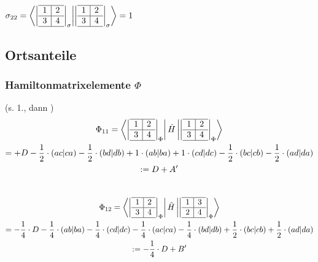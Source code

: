 \documentclass[12pt,a4paper]{article}
\begin{document}
$\sigma_{22} = \bra{\left|
  \begin{array}{c|c}
  \hline 
    1 & 2 \\ \hline 
    3 & 4 \\
    \hline 
  \end{array}
\right|_\sigma }  \ket{\left|
  \begin{array}{c|c}
  \hline 
    1 & 2 \\ \hline 
    3 & 4 \\
    \hline 
  \end{array}
 \right|_\sigma} = 1$ \\

\subsection{Ortsanteile}
\subsubsection{Hamiltonmatrixelemente $\Phi$}
(s. 1., dann )
\begin{gather}
\Phi_{11} = \bra{
\left|
  \begin{array}{c|c}
  \hline 
    1 & 2 \\ \hline 
    3 & 4 \\
    \hline 
  \end{array}
\right| _{\Phi}
} \hat{H} \ket{
\left|
  \begin{array}{c|c}
  \hline 
    1 & 2 \\ \hline 
    3 & 4 \\
    \hline 
  \end{array}
\right| _{\Phi}
} \\
 = + D - \frac{1}{2} \cdot (ac|ca) - \frac{1}{2} \cdot (bd|db) + 1 \cdot (ab|ba) + 1 \cdot (cd|dc) - \frac{1}{2} \cdot (bc|cb) - \frac{1}{2} \cdot (ad|da) \\ 
 := D + A' \label{eq:def_A_Strich}
 \end{gather} \\


\begin{gather}
\Phi_{12} = \bra{
\left|
  \begin{array}{c|c}
  \hline 
    1 & 2 \\ \hline 
    3 & 4 \\
    \hline 
  \end{array}
\right| _{\Phi}
} \hat{H} \ket{
\left|
  \begin{array}{c|c}
  \hline 
    1 & 3 \\ \hline 
    2 & 4 \\
    \hline 
  \end{array}
\right| _{\Phi}
} \\
 = - \frac{1}{4} \cdot D - \frac{1}{4} \cdot (ab|ba) - \frac{1}{4} \cdot (cd|dc) - \frac{1}{4} \cdot (ac|ca) -  \frac{1}{4} \cdot (bd|db) + \frac{1}{2} \cdot (bc|cb) + \frac{1}{2} \cdot (ad|da) \\
 \label{eq:def_B_Strich}
 := -\frac{1}{4}\cdot D + B' 
 \end{gather} \\
\end{document}
